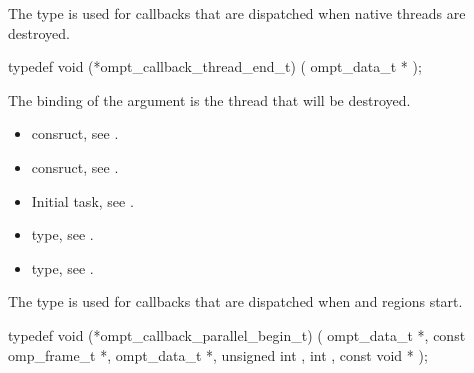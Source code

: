 \label{sec:ompt_callback_thread_end_t}

\summary
The  type is used for callbacks 
that are dispatched when native threads are destroyed.

\format
\begin{ccppspecific}
\begin{omptCallback}
typedef void (*ompt_callback_thread_end_t) (
  ompt_data_t *
);
\end{omptCallback}
\end{ccppspecific}

\argdesc
The binding of the  argument is the thread that will be destroyed.

\crossreferences
\begin{itemize}
\item {} consruct, see .

\item {} consruct, see .

\item Initial task, see .

\item {} type, see .

\item {} type, see .
\end{itemize}



\label{sec:ompt_callback_parallel_begin_t}

\summary
The  type is used for callbacks 
that are dispatched when  and  regions start.

\format
\begin{ccppspecific}
\begin{omptCallback}
typedef void (*ompt_callback_parallel_begin_t) (
  ompt_data_t *,
  const omp_frame_t *,
  ompt_data_t *,
  unsigned int ,
  int ,
  const void *
);
\end{omptCallback}
\end{ccppspecific}

